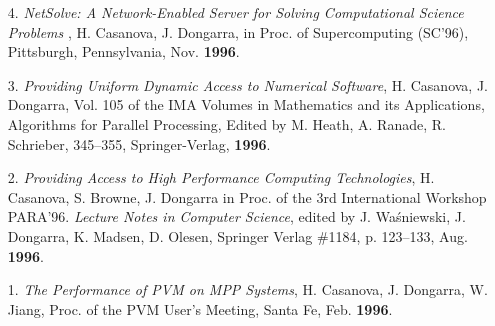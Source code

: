\begin{enumerate}
\item[4.]
{\it NetSolve: A Network-Enabled Server for Solving Computational
Science Problems }, H. Casanova, J. Dongarra, in Proc.
of Supercomputing (SC'96), Pittsburgh, Pennsylvania, Nov. {\bf 1996}.


\item[3.]
{\it Providing Uniform Dynamic Access to Numerical Software}, H. Casanova,
J. Dongarra, Vol. 105 of the IMA Volumes in Mathematics and its
Applications, Algorithms for Parallel Processing, Edited by M. Heath,
A. Ranade, R. Schrieber, 345--355, Springer-Verlag, {\bf 1996}.

\item[2.]
{\it Providing Access to High Performance Computing Technologies},
H. Casanova, S. Browne, J. Dongarra in Proc. of the 3rd
International Workshop PARA'96. \emph{Lecture Notes in Computer Science},
edited by J. Wa\'sniewski, J. Dongarra, K. Madsen, D. Olesen, Springer
Verlag \#1184, p. 123--133, Aug. {\bf 1996}.

\item[1.]
{\it The Performance of PVM on MPP Systems}, H. Casanova, J. Dongarra,
W. Jiang, Proc. of the PVM User's Meeting, Santa Fe, Feb.
{\bf 1996}.

\end{enumerate}


